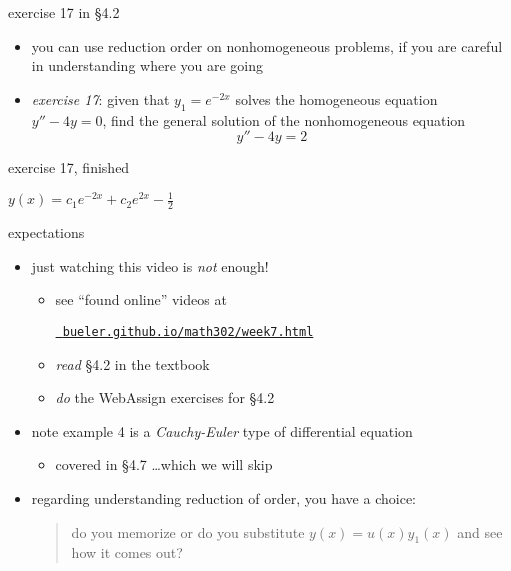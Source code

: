\documentclass[dvipsnames]{beamer}
\begin{document}
\begin{frame}{exercise 17 in \S4.2}

\begin{itemize}
\item you can use reduction order on nonhomogeneous problems, if you are careful in understanding where you are going
\item \emph{exercise 17}:  given that $y_1=e^{-2x}$ solves the homogeneous equation $y''-4y=0$, find the general solution of the nonhomogeneous equation
    $$y'' - 4y = 2$$
\end{itemize}

\vspace{50mm}
\end{frame}


\begin{frame}{exercise 17, finished}

\vspace{60mm}

\hfill $y(x) = c_1 e^{-2x} + c_2 e^{2x} - \frac{1}{2}$
\end{frame}


\begin{frame}{expectations}

\begin{itemize}
\item just watching this video is \emph{not} enough!
     \begin{itemize}
     \item see ``found online'' videos at

     \centerline{\href{https://bueler.github.io/math302/week7.html}{\tt \color{cyan} bueler.github.io/math302/week7.html}}
     \item \emph{read} \S 4.2 in the textbook
     \item \emph{do} the WebAssign exercises for \S 4.2
     \end{itemize}
\item note example 4 is a \emph{Cauchy-Euler} type of differential equation
     \begin{itemize}
     \item covered in \S 4.7 \dots which we will skip
     \end{itemize}
\item regarding understanding reduction of order, you have a choice:
     \begin{quotation}
     \noindent do you memorize  or do you substitute $y(x) = u(x) y_1(x)$ and see how it comes out?
     \end{quotation}
\end{itemize}
\end{frame}
\end{document}
